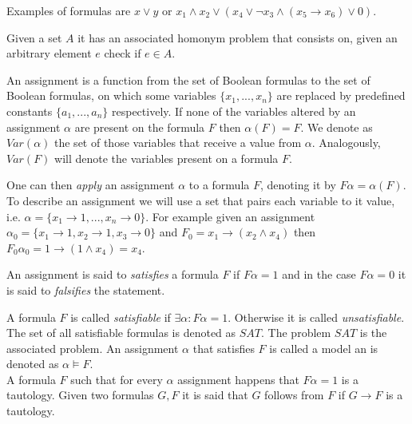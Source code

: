 Examples of formulas are $x\vee y$ or $x_1\wedge x_2 \vee  ( x_4 \vee \neg  x_3 \wedge (x_5\rightarrow x_6) \vee 0 )$.\\


\begin{definition} Given a set $A$ it has an associated homonym problem that consists on, given an arbitrary element $e$ check if $e\in A$.	
\end{definition}


\begin{definition}
	An assignment is a function from the set of Boolean formulas to the set of Boolean formulas, on which some variables $\{x_1,...,x_n \}$ are replaced by predefined constants $\{a_1,...,a_n\}$ respectively. If none of the variables altered by an assignment $\alpha$ are present on the formula $F$ then $\alpha(F) = F$. We denote as $Var(\alpha)$ the set of those variables that receive a value from $\alpha$. Analogously, $Var(F)$ will denote the variables present on a formula $F$.
	\end{definition}

	
	One can then \emph{apply} an assignment $\alpha$ to a formula $F$, denoting it by $F\alpha=\alpha(F)$. To describe an assignment we will use a set that pairs each variable to it value, i.e. $\alpha=\{x_1\to 1,...,x_n\to 0\}$. For example given an assignment $\alpha_0 = \{x_1 \to 1, x_2\to 1, x_3 \to 0\}$ and $F_0=x_1\to (x_2\wedge x_4)$ then  $F_0\alpha_0=1 \to (1\wedge x_4)= x_4$. \\
	
	\begin{definition}
	An assignment is said to \emph{satisfies}  a formula $F$ if $F\alpha=1$ and in the case $F  \alpha = 0 $ it is said to \emph{falsifies} the statement.
\end{definition}
	
	\begin{definition}
	A formula $F$ is called \emph{satisfiable} if $\exists \alpha : F\alpha = 1.$ Otherwise it is called \emph{unsatisfiable}. The set of all satisfiable formulas is denoted as $SAT$.  The problem $SAT$ is the associated problem. 	An assignment $\alpha$ that satisfies $F$ is called a model an is denoted as $\alpha \models F$.\\
	
	
	A formula $F$ such that for every  $\alpha$ assignment happens that $F\alpha=1$ is a tautology. Given two formulas $G,F$ it is said that $G$ follows from $F$ if $G\rightarrow F$ is a tautology. \\
\end{definition}
	
